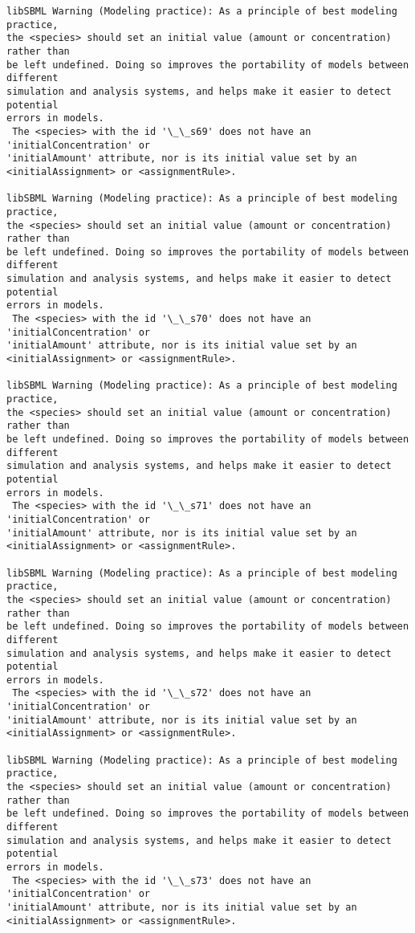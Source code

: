 \documentclass[11pt]{article}
\begin{document}
\begin{Verbatim}[commandchars=\\\{\}]
libSBML Warning (Modeling practice): As a principle of best modeling practice,
the <species> should set an initial value (amount or concentration) rather than
be left undefined. Doing so improves the portability of models between different
simulation and analysis systems, and helps make it easier to detect potential
errors in models.
 The <species> with the id '\_\_s69' does not have an 'initialConcentration' or
'initialAmount' attribute, nor is its initial value set by an
<initialAssignment> or <assignmentRule>.

libSBML Warning (Modeling practice): As a principle of best modeling practice,
the <species> should set an initial value (amount or concentration) rather than
be left undefined. Doing so improves the portability of models between different
simulation and analysis systems, and helps make it easier to detect potential
errors in models.
 The <species> with the id '\_\_s70' does not have an 'initialConcentration' or
'initialAmount' attribute, nor is its initial value set by an
<initialAssignment> or <assignmentRule>.

libSBML Warning (Modeling practice): As a principle of best modeling practice,
the <species> should set an initial value (amount or concentration) rather than
be left undefined. Doing so improves the portability of models between different
simulation and analysis systems, and helps make it easier to detect potential
errors in models.
 The <species> with the id '\_\_s71' does not have an 'initialConcentration' or
'initialAmount' attribute, nor is its initial value set by an
<initialAssignment> or <assignmentRule>.

libSBML Warning (Modeling practice): As a principle of best modeling practice,
the <species> should set an initial value (amount or concentration) rather than
be left undefined. Doing so improves the portability of models between different
simulation and analysis systems, and helps make it easier to detect potential
errors in models.
 The <species> with the id '\_\_s72' does not have an 'initialConcentration' or
'initialAmount' attribute, nor is its initial value set by an
<initialAssignment> or <assignmentRule>.

libSBML Warning (Modeling practice): As a principle of best modeling practice,
the <species> should set an initial value (amount or concentration) rather than
be left undefined. Doing so improves the portability of models between different
simulation and analysis systems, and helps make it easier to detect potential
errors in models.
 The <species> with the id '\_\_s73' does not have an 'initialConcentration' or
'initialAmount' attribute, nor is its initial value set by an
<initialAssignment> or <assignmentRule>.


\end{Verbatim}
\end{document}

